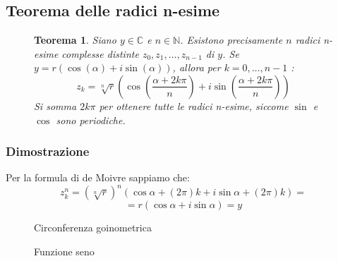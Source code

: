 \documentclass[a4paper]{article}
\newtheorem{theorem}{Teorema}
\theoremstyle{break}
\theoremstyle{break}
\theoremstyle{break}
\theoremstyle{break}
\begin{document}
\subsection{Teorema delle radici n-esime}
\begin{figure}[H]
	\begin{theorem}
		Siano \( y \in \mathbb{C} \) e \( n \in \mathbb{N} \). Esistono precisamente \( n \) radici n-esime
		complesse distinte \( z_0, z_1, \ldots, z_{n-1} \) di \( y \). Se \( y = r(\cos(\alpha)+i\sin(\alpha)) \),
		allora per \( k = 0, \ldots, n-1 \) :
		\[
			z_k = \sqrt[n]{r} \left( \cos\left(\frac{\alpha + 2k\pi}{n}\right) + i \sin\left(\frac{\alpha + 2k\pi}{n}\right) \right)
		\]
		Si somma \( 2k \pi  \) per ottenere tutte le radici n-esime, siccome \( \sin \) e \( \cos \) sono periodiche.
		\label{th:radici_n-esime}
	\end{theorem}
\end{figure}

\subsubsection{Dimostrazione}
Per la formula di de Moivre sappiamo che:
\[
	z_k^n = \left( \sqrt[n]{r} \right)^n \left( \cos{\alpha + (2 \pi )k} + i \sin{\alpha + (2 \pi )k} \right)  =
\]
\[
	= r \left( \cos{\alpha} + i \sin{\alpha} \right) = y
\]

\begin{figure}[H]
	\centering
	\caption{Circonferenza goinometrica}
\end{figure}

\begin{figure}[H]
	\centering
	\caption{Funzione seno}
\end{figure}
\end{document}
